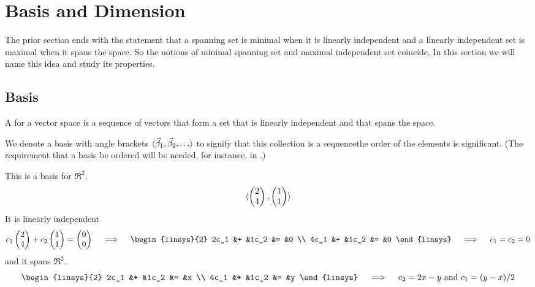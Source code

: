 \section{Basis and Dimension}
The prior section ends with the statement that
a spanning set is minimal when it is linearly independent and
a linearly independent set is maximal when it spans the space.
So the notions of minimal spanning set and maximal independent set 
coincide.
In this section we will name this idea and study its properties.





\subsection{Basis}
\begin{definition}
A  
for a vector
space is a sequence of vectors that form a set that is linearly independent 
and that spans the space.
\end{definition}

We denote a basis with angle brackets
\( \langle\vec{\beta}_1,\vec{\beta}_2,\ldots\rangle \)
to signify that this collection is a 
sequence\Dash the 
order of the elements is significant.
(The requirement that a basis be ordered will be needed, for
instance, in .)

\begin{example}  \label{ex:FstBasisRTwo}
This is a basis for \( \Re^2 \).
\begin{equation*}
  \langle \begin{pmatrix} 2 \\ 4 \end{pmatrix},\begin{pmatrix} 1 \\ 1 \end{pmatrix} \rangle
\end{equation*}
It is linearly independent
\begin{equation*}
  c_1\colvec{2 \\ 4}+c_2\colvec{1 \\ 1}=\colvec{0 \\ 0}
  \quad\implies\quad
  \begin{linsys}{2}
     2c_1  &+  &1c_2  &=  &0  \\
     4c_1  &+  &1c_2  &=  &0  
   \end{linsys}
  \quad\implies\quad
  c_1=c_2=0
\end{equation*}
and it spans \( \Re^2 \).
\begin{equation*}
  \begin{linsys}{2}
    2c_1  &+  &1c_2  &=  &x  \\
    4c_1  &+  &1c_2  &=  &y  
  \end{linsys}
  \quad\implies\quad
  c_2=2x-y\text{\ and\ } c_1=(y-x)/2
\end{equation*}
\end{example}

